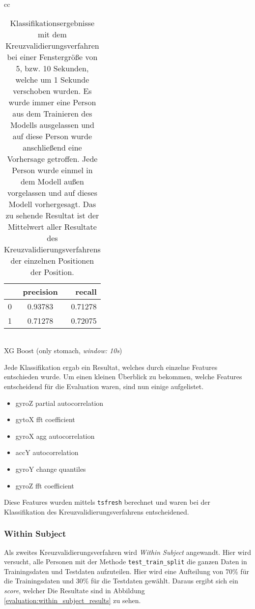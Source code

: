 \begin{table}
\begin{tabular}{cc}
      \begin{minipage}{0.33\textwidth}
          \begin{center}
              \begin{tabular}{ | l | c | r | }
                \hline
                 & precision & recall \\ \hline
                0 & 0.93783 & 0.71278 \\ \hline
                1 & 0.71278 & 0.72075 \\
                \hline
              \end{tabular}
              \smallskip 
              \\ XG Boost (only stomach, \textit{window: 10s})
          \end{center}
      \end{minipage}
  \end{tabular}
  \caption{Klassifikationsergebnisse mit dem Kreuzvalidierungsverfahren bei einer Fenstergröße von 5, bzw. 10 Sekunden, welche um 1 Sekunde verschoben wurden. Es wurde immer eine Person aus dem Trainieren des Modells ausgelassen und auf diese Person wurde anschließend eine Vorhersage getroffen. Jede Person wurde einmel in dem Modell außen vorgelassen und auf dieses Modell vorhergesagt. Das zu sehende Resultat ist der Mittelwert aller Resultate des Kreuzvalidierungsverfahrens der einzelnen Positionen der Position.}
  \label{evaluation:loso_classification_results}
  \end{table}


Jede Klassifikation ergab ein Resultat, welches durch einzelne Features entschieden wurde. 
Um einen kleinen Überblick zu bekommen, welche Features entscheidend für die Evaluation waren, sind nun einige aufgelistet.
\begin{itemize}
    \item gyroZ partial autocorrelation
    \item gytoX fft coefficient
    \item gyroX agg autocorrelation
    \item accY autocorrelation
    \item gyroY change quantiles 
    \item gyroZ fft coefficient
\end{itemize}
Diese Features wurden mittels \texttt{tsfresh} berechnet und waren bei der Klassifikation des Kreuzvalidierungsverfahrens entscheidened.

\subsubsection{Within Subject}
Als zweites Kreuzvalidierungsverfahren wird \textit{Within Subject} angewandt.
Hier wird versucht, alle Personen mit der Methode \texttt{test\_train\_split} die ganzen Daten in Trainingsdaten und Testdaten aufzuteilen.
Hier wird eine Aufteilung von 70\% für die Trainingsdaten und 30\% für die Testdaten gewählt. 
Daraus ergibt sich ein \textit{score}, welcher 
Die Resultate sind in Abbildung \ref{evaluation:within_subject_results} zu sehen.

